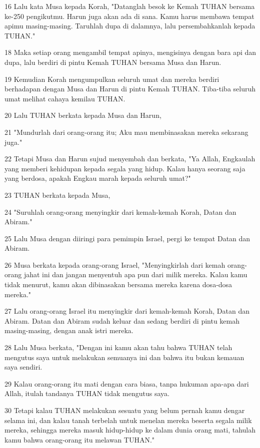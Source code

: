 \par 16 Lalu kata Musa kepada Korah, "Datanglah besok ke Kemah TUHAN bersama ke-250 pengikutmu. Harun juga akan ada di sana. Kamu harus membawa tempat apimu masing-masing. Taruhlah dupa di dalamnya, lalu persembahkanlah kepada TUHAN."
\par 18 Maka setiap orang mengambil tempat apinya, mengisinya dengan bara api dan dupa, lalu berdiri di pintu Kemah TUHAN bersama Musa dan Harun.
\par 19 Kemudian Korah mengumpulkan seluruh umat dan mereka berdiri berhadapan dengan Musa dan Harun di pintu Kemah TUHAN. Tiba-tiba seluruh umat melihat cahaya kemilau TUHAN.
\par 20 Lalu TUHAN berkata kepada Musa dan Harun,
\par 21 "Mundurlah dari orang-orang itu; Aku mau membinasakan mereka sekarang juga."
\par 22 Tetapi Musa dan Harun sujud menyembah dan berkata, "Ya Allah, Engkaulah yang memberi kehidupan kepada segala yang hidup. Kalau hanya seorang saja yang berdosa, apakah Engkau marah kepada seluruh umat?"
\par 23 TUHAN berkata kepada Musa,
\par 24 "Suruhlah orang-orang menyingkir dari kemah-kemah Korah, Datan dan Abiram."
\par 25 Lalu Musa dengan diiringi para pemimpin Israel, pergi ke tempat Datan dan Abiram.
\par 26 Musa berkata kepada orang-orang Israel, "Menyingkirlah dari kemah orang-orang jahat ini dan jangan menyentuh apa pun dari milik mereka. Kalau kamu tidak menurut, kamu akan dibinasakan bersama mereka karena dosa-dosa mereka."
\par 27 Lalu orang-orang Israel itu menyingkir dari kemah-kemah Korah, Datan dan Abiram. Datan dan Abiram sudah keluar dan sedang berdiri di pintu kemah masing-masing, dengan anak istri mereka.
\par 28 Lalu Musa berkata, "Dengan ini kamu akan tahu bahwa TUHAN telah mengutus saya untuk melakukan semuanya ini dan bahwa itu bukan kemauan saya sendiri.
\par 29 Kalau orang-orang itu mati dengan cara biasa, tanpa hukuman apa-apa dari Allah, itulah tandanya TUHAN tidak mengutus saya.
\par 30 Tetapi kalau TUHAN melakukan sesuatu yang belum pernah kamu dengar selama ini, dan kalau tanah terbelah untuk menelan mereka beserta segala milik mereka, sehingga mereka masuk hidup-hidup ke dalam dunia orang mati, tahulah kamu bahwa orang-orang itu melawan TUHAN."
